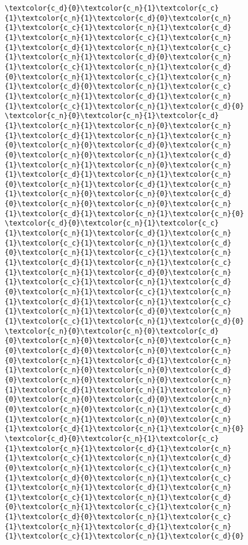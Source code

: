 \begin{figure}[!h]
\begin{BVerbatim}[commandchars=\\\{\},codes={\catcode`=3\catcode`^=7\catcode`_=8}]
\textcolor{c_d}{0}\textcolor{c_n}{1}\textcolor{c_c}{1}\textcolor{c_n}{1}\textcolor{c_d}{0}\textcolor{c_n}{1}\textcolor{c_c}{1}\textcolor{c_n}{1}\textcolor{c_d}{1}\textcolor{c_n}{1}\textcolor{c_c}{1}\textcolor{c_n}{1}\textcolor{c_d}{1}\textcolor{c_n}{1}\textcolor{c_c}{1}\textcolor{c_n}{1}\textcolor{c_d}{0}\textcolor{c_n}{1}\textcolor{c_c}{1}\textcolor{c_n}{1}\textcolor{c_d}{0}\textcolor{c_n}{1}\textcolor{c_c}{1}\textcolor{c_n}{1}\textcolor{c_d}{0}\textcolor{c_n}{1}\textcolor{c_c}{1}\textcolor{c_n}{1}\textcolor{c_d}{1}\textcolor{c_n}{1}\textcolor{c_c}{1}\textcolor{c_n}{1}\textcolor{c_d}{0}
\textcolor{c_n}{0}\textcolor{c_n}{1}\textcolor{c_d}{1}\textcolor{c_n}{1}\textcolor{c_n}{0}\textcolor{c_n}{1}\textcolor{c_d}{1}\textcolor{c_n}{1}\textcolor{c_n}{0}\textcolor{c_n}{0}\textcolor{c_d}{0}\textcolor{c_n}{0}\textcolor{c_n}{0}\textcolor{c_n}{1}\textcolor{c_d}{1}\textcolor{c_n}{1}\textcolor{c_n}{0}\textcolor{c_n}{1}\textcolor{c_d}{1}\textcolor{c_n}{1}\textcolor{c_n}{0}\textcolor{c_n}{1}\textcolor{c_d}{1}\textcolor{c_n}{1}\textcolor{c_n}{0}\textcolor{c_n}{0}\textcolor{c_d}{0}\textcolor{c_n}{0}\textcolor{c_n}{0}\textcolor{c_n}{1}\textcolor{c_d}{1}\textcolor{c_n}{1}\textcolor{c_n}{0}
\textcolor{c_d}{0}\textcolor{c_n}{1}\textcolor{c_c}{1}\textcolor{c_n}{1}\textcolor{c_d}{1}\textcolor{c_n}{1}\textcolor{c_c}{1}\textcolor{c_n}{1}\textcolor{c_d}{0}\textcolor{c_n}{1}\textcolor{c_c}{1}\textcolor{c_n}{1}\textcolor{c_d}{1}\textcolor{c_n}{1}\textcolor{c_c}{1}\textcolor{c_n}{1}\textcolor{c_d}{0}\textcolor{c_n}{1}\textcolor{c_c}{1}\textcolor{c_n}{1}\textcolor{c_d}{0}\textcolor{c_n}{1}\textcolor{c_c}{1}\textcolor{c_n}{1}\textcolor{c_d}{1}\textcolor{c_n}{1}\textcolor{c_c}{1}\textcolor{c_n}{1}\textcolor{c_d}{0}\textcolor{c_n}{1}\textcolor{c_c}{1}\textcolor{c_n}{1}\textcolor{c_d}{0}
\textcolor{c_n}{0}\textcolor{c_n}{0}\textcolor{c_d}{0}\textcolor{c_n}{0}\textcolor{c_n}{0}\textcolor{c_n}{0}\textcolor{c_d}{0}\textcolor{c_n}{0}\textcolor{c_n}{0}\textcolor{c_n}{1}\textcolor{c_d}{1}\textcolor{c_n}{1}\textcolor{c_n}{0}\textcolor{c_n}{0}\textcolor{c_d}{0}\textcolor{c_n}{0}\textcolor{c_n}{0}\textcolor{c_n}{1}\textcolor{c_d}{1}\textcolor{c_n}{1}\textcolor{c_n}{0}\textcolor{c_n}{0}\textcolor{c_d}{0}\textcolor{c_n}{0}\textcolor{c_n}{0}\textcolor{c_n}{1}\textcolor{c_d}{1}\textcolor{c_n}{1}\textcolor{c_n}{0}\textcolor{c_n}{1}\textcolor{c_d}{1}\textcolor{c_n}{1}\textcolor{c_n}{0}
\textcolor{c_d}{0}\textcolor{c_n}{1}\textcolor{c_c}{1}\textcolor{c_n}{1}\textcolor{c_d}{1}\textcolor{c_n}{1}\textcolor{c_c}{1}\textcolor{c_n}{1}\textcolor{c_d}{0}\textcolor{c_n}{1}\textcolor{c_c}{1}\textcolor{c_n}{1}\textcolor{c_d}{0}\textcolor{c_n}{1}\textcolor{c_c}{1}\textcolor{c_n}{1}\textcolor{c_d}{1}\textcolor{c_n}{1}\textcolor{c_c}{1}\textcolor{c_n}{1}\textcolor{c_d}{0}\textcolor{c_n}{1}\textcolor{c_c}{1}\textcolor{c_n}{1}\textcolor{c_d}{0}\textcolor{c_n}{1}\textcolor{c_c}{1}\textcolor{c_n}{1}\textcolor{c_d}{1}\textcolor{c_n}{1}\textcolor{c_c}{1}\textcolor{c_n}{1}\textcolor{c_d}{0}

\end{BVerbatim}
\end{figure}
